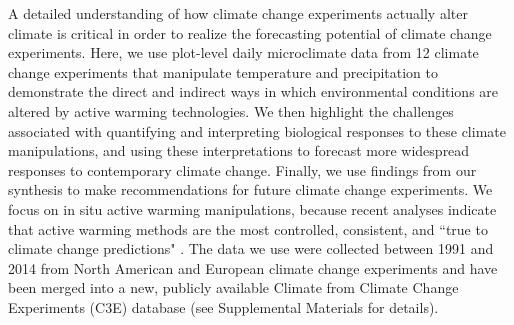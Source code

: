 \documentclass{article}
\begin{document}
\par A detailed understanding of how climate change experiments actually alter climate is critical in order to realize the forecasting potential of climate change experiments. Here, we use  plot-level daily  microclimate  data  from  12 climate  change  experiments  that  manipulate temperature and precipitation to demonstrate the direct and indirect ways in which environmental conditions are altered  by active  warming technologies. We then highlight the challenges associated with quantifying and interpreting biological responses to these climate manipulations, and using these interpretations to forecast  more widespread responses to contemporary climate change. Finally,  we use findings from our synthesis to make recommendations for future  climate  change experiments.  We focus on in situ active warming  manipulations, because recent analyses indicate that active warming methods are the most controlled, consistent, and ``true to climate change predictions" \citep{kimball2005,kimball2008,aronson2009,wolkovich2012}. The data we use were collected between 1991 and 2014 from North American and European climate change experiments and  have been merged into a new, publicly  available  Climate from Climate Change Experiments (C3E) database (see Supplemental Materials  for details). 

\end{document}
